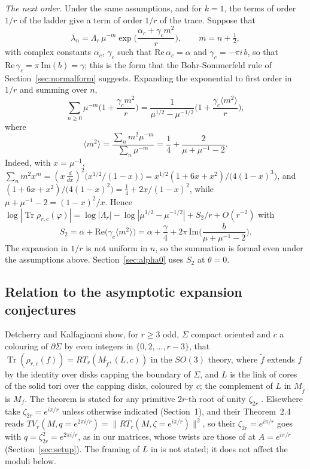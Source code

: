 \documentclass[11pt]{amsart}
\theoremstyle{definition}
\theoremstyle{remark}
\newcommand{\Tr}{\operatorname{Tr}}
\begin{document}
\emph{The next order.} Under the same assumptions, and for $k = 1$, the terms of
order $1/r$ of the ladder give a term of order $1/r$ of the trace. Suppose that
\[
\lambda_n = \Lambda_r\,\mu^{-m}\exp\!\Big(\frac{\alpha_c + \gamma_c m^2}{r}\Big),
\qquad m = n + \tfrac12,
\]
with complex constants $\alpha_c$, $\gamma_c$ such that $\mathrm{Re}\,\alpha_c =
\alpha$ and $\gamma_c = -\pi i\,b$, so that $\mathrm{Re}\,\gamma_c =
\pi\,\mathrm{Im}(b) = \gamma$; this is the form that the Bohr-Sommerfeld rule of
Section~\ref{sec:normalform} suggests. Expanding the exponential to first order in
$1/r$ and summing over $n$,
\[
\sum_{n \ge 0} \mu^{-m}\Big(1 + \frac{\gamma_c m^2}{r}\Big)
= \frac{1}{\mu^{1/2} - \mu^{-1/2}}\Big(1 + \frac{\gamma_c\langle m^2\rangle}{r}\Big),
\]
where
\[
\langle m^2\rangle = \frac{\sum_n m^2\mu^{-m}}{\sum_n \mu^{-m}}
= \frac14 + \frac{2}{\mu + \mu^{-1} - 2}.
\]
Indeed, with $x = \mu^{-1}$, $\sum_n m^2 x^m = (x\,\tfrac{d}{dx})^2\big(x^{1/2}/(1-x)\big)
= x^{1/2}(1 + 6x + x^2)/\big(4(1-x)^3\big)$, and $(1 + 6x + x^2)/\big(4(1-x)^2\big) =
\frac14 + 2x/(1-x)^2$, while $\mu + \mu^{-1} - 2 = (1-x)^2/x$. Hence
$\log|\Tr\rho_{r,c}(\varphi)| = \log|\Lambda_r| - \log|\mu^{1/2} - \mu^{-1/2}| + S_2/r
+ O(r^{-2})$ with
\begin{equation}\label{eq:S2}
S_2 = \alpha + \mathrm{Re}\big(\gamma_c\langle m^2\rangle\big)
= \alpha + \frac{\gamma}{4} + 2\pi\,\mathrm{Im}\Big(\frac{b}{\mu + \mu^{-1} - 2}\Big).
\end{equation}
The expansion in $1/r$ is not uniform in $n$, so the summation is formal even under
the assumptions above. Section~\ref{sec:alpha0} uses $S_2$ at $\theta = 0$.

\subsection{Relation to the asymptotic expansion conjectures}\label{sec:relation}
Detcherry and Kalfagianni \cite[Thm.~2.3]{DK} show, for $r \ge 3$ odd, $\Sigma$
compact oriented and $c$ a colouring of $\partial\Sigma$ by even integers in
$\{0, 2, \dots, r-3\}$, that
$\Tr(\rho_{r,c}(f)) = RT_r(M_{\tilde f}, (L,c))$ in the $SO(3)$ theory, where $\tilde f$
extends $f$ by the identity over disks capping the boundary of $\Sigma$, and $L$ is the
link of cores of the solid tori over the capping disks, coloured by $c$; the
complement of $L$ in $M_{\tilde f}$ is $M_f$. The theorem is stated for any primitive
$2r$-th root of unity $\zeta_{2r}$ \cite[Section~2.2]{DK}. Elsewhere \cite{DK} take
$\zeta_{2r} = e^{i\pi/r}$ unless otherwise indicated (Section~1), and their
Theorem~2.4 reads $TV_r(M, q = e^{2\pi i/r}) = \|RT_r(M, \zeta = e^{i\pi/r})\|^2$, so
their $\zeta_{2r} = e^{i\pi/r}$ goes with $q = \zeta_{2r}^2 = e^{2\pi i/r}$, as in our
matrices, whose twists are those of \cite[5.8]{BHMV} at $A = e^{i\pi/r}$
(Section~\ref{sec:setup}). The framing of $L$ in \cite[Thm.~2.3]{DK} is not stated;
it does not affect the moduli below.
\end{document}
